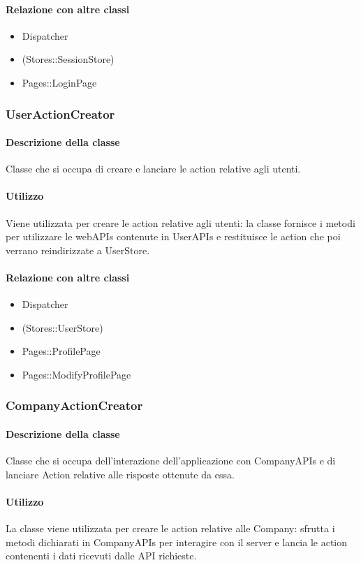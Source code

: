 \paragraph*{Relazione con altre classi}
\begin{itemize}
\item Dispatcher
\item (Stores::SessionStore)
\item Pages::LoginPage
\end{itemize}

\subsubsection{UserActionCreator}
\paragraph*{Descrizione della classe}
Classe che si occupa di creare e lanciare le action relative agli utenti.
\paragraph*{Utilizzo}
Viene utilizzata per creare le action relative agli utenti: la classe fornisce i metodi per utilizzare le webAPIs contenute in UserAPIs e restituisce le action che poi verrano reindirizzate a UserStore.

\paragraph*{Relazione con altre classi}
\begin{itemize}
\item Dispatcher
\item (Stores::UserStore)
\item Pages::ProfilePage
\item Pages::ModifyProfilePage
\end{itemize}

\subsubsection{CompanyActionCreator}
\paragraph*{Descrizione della classe}
Classe che si occupa dell'interazione dell'applicazione con CompanyAPIs e di lanciare Action relative alle risposte ottenute da essa.
\paragraph*{Utilizzo}
La classe viene utilizzata per creare le action relative alle Company: sfrutta i metodi dichiarati in CompanyAPIs per interagire con il server e lancia le action contenenti i dati ricevuti dalle API richieste.

